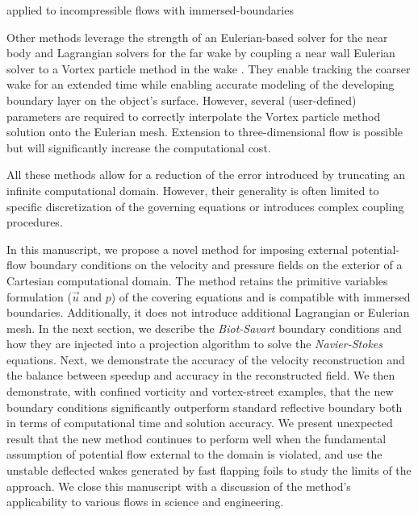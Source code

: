 \documentclass{article}
\begin{document}
\cite{Liska2014AEquations} applied to incompressible flows with immersed-boundaries \cite{Liska2017AFunctions} \cite{Liska2016ADomains}

\cite{Tsynkov1998NumericalReview}


Other methods leverage the strength of an Eulerian-based solver for the near body and Lagrangian solvers for the far wake by coupling a near wall Eulerian solver to a Vortex particle method in the wake \cite{Billuart2023AFlows}. They enable tracking the coarser wake for an extended time while enabling accurate modeling of the developing boundary layer on the object's surface. However, several (user-defined) parameters are required to correctly interpolate the Vortex particle method solution onto the Eulerian mesh. Extension to three-dimensional flow is possible but will significantly increase the computational cost.

All these methods allow for a reduction of the error introduced by truncating an infinite computational domain. However, their generality is often limited to specific discretization of the governing equations or introduces complex coupling procedures.
 
In this manuscript, we propose a novel method for imposing external potential-flow boundary conditions on the velocity and pressure fields on the exterior of a Cartesian computational domain. The method retains the primitive variables formulation ($\vec u$ and $p$) of the covering equations and is compatible with immersed boundaries. Additionally, it does not introduce additional Lagrangian or Eulerian mesh. In the next section, we describe the \emph{Biot-Savart} boundary conditions and how they are injected into a projection algorithm to solve the \emph{Navier-Stokes} equations. Next, we demonstrate the accuracy of the velocity reconstruction and the balance between speedup and accuracy in the reconstructed field. We then demonstrate, with confined vorticity and vortex-street examples, that the new boundary conditions significantly outperform standard reflective boundary both in terms of computational time and solution accuracy. We present unexpected result that the new method continues to perform well when the fundamental assumption of potential flow external to the domain is violated, and use the unstable deflected wakes generated by fast flapping foils to study the limits of the approach. We close this manuscript with a discussion of the method's applicability to various flows in science and engineering.

\end{document}
